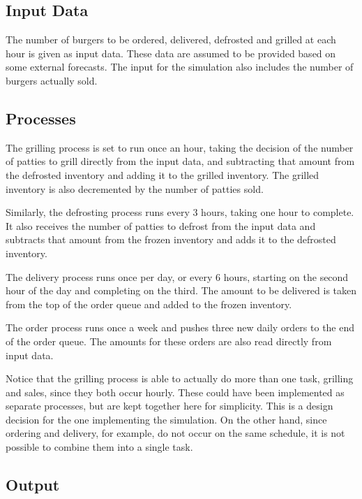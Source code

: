 \documentclass[12pt]{article}
\numberwithin{equation}{section}
\numberwithin{table}{section}
\numberwithin{figure}{section}
\begin{document}
\subsection{Input Data}
\label{sec:burger_inputs}

The number of burgers to be ordered, delivered, defrosted and grilled at each hour is given as input data. These data are assumed to be provided based on some external forecasts. The input for the simulation also includes the number of burgers actually sold.

\subsection{Processes}
\label{sec:burger_processes}

The grilling process is set to run once an hour, taking the decision of the number of patties to grill directly from the input data, and subtracting that amount from the defrosted inventory and adding it to the grilled inventory. The grilled inventory is also decremented by the number of patties sold.

Similarly, the defrosting process runs every 3 hours, taking one hour to complete. It also receives the number of patties to defrost from the input data and subtracts that amount from the frozen inventory and adds it to the defrosted inventory.

The delivery process runs once per day, or every 6 hours, starting on the second hour of the day and completing on the third. The amount to be delivered is taken  from the top of the order queue and added to the frozen inventory.

The order process runs once a week and pushes three new daily orders to the end of the order queue. The amounts for these orders are also read directly from input data.

Notice that the grilling process is able to actually do more than one task, grilling and sales, since they both occur hourly. These could have been implemented as separate processes, but are kept together here for simplicity. This is a design decision for the one implementing the simulation. On the other hand, since ordering and delivery, for example, do not occur on the same schedule, it is not possible to combine them into a single task.

\subsection{Output}
\label{sec:burger_outputs}
\end{document}
